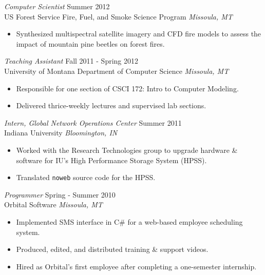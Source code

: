 \documentclass[line,margin]{res}
\begin{document}
\begin{resume}
        {\sl Computer Scientist} \hfill  Summer 2012\\
        US Forest Service Fire, Fuel, and Smoke Science Program \hfill {\sl Missoula, MT}
        \begin{itemize} \itemsep -2pt
            \item Synthesized multispectral satellite imagery and CFD fire models to assess the impact of mountain pine beetles on forest fires.
        \end{itemize}

        {\sl Teaching Assistant} \hfill  Fall 2011 - Spring 2012\\
        University of Montana Department of Computer Science \hfill {\sl Missoula, MT}
        \begin{itemize} \itemsep -2pt
            \item Responsible for one section of CSCI 172: Intro to Computer Modeling.
            \item Delivered thrice-weekly lectures and supervised lab sections.
        \end{itemize}

        {\sl Intern, Global Network Operations Center} \hfill  Summer 2011\\
        Indiana University \hfill {\sl Bloomington, IN}
        \begin{itemize} \itemsep -2pt
            \item Worked with the Research Technologies group to upgrade hardware \& software for IU's High Performance Storage System (HPSS).
            \item Translated \verb!noweb! source code for the HPSS.
        \end{itemize}

        {\sl Programmer} \hfill Spring - Summer 2010\\
        Orbital Software \hfill {\sl Missoula, MT}
        \begin{itemize} \itemsep -2pt
            \item Implemented SMS interface in C\# for a web-based employee scheduling system.
            \item Produced, edited, and distributed training \& support videos.
			\item Hired as Orbital's first employee after completing a one-semester internship.
        \end{itemize}



\end{resume}
\end{document}

